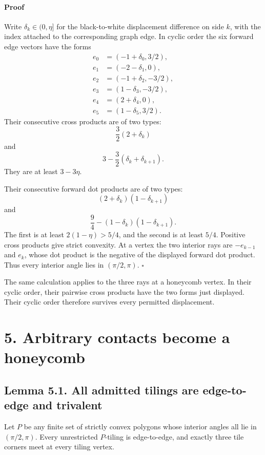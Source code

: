 \documentclass[11pt]{article}
\begin{document}
\paragraph{Proof}

Write \(\delta_k\in(0,\eta]\) for the black-to-white displacement difference
on side \(k\), with the index attached to the corresponding graph edge. In
cyclic order the six forward edge vectors have the forms
\[
\begin{split}
e_0&=(-1+\delta_0,3/2),\\
e_1&=(-2-\delta_1,0),\\
e_2&=(-1+\delta_2,-3/2),\\
e_3&=(1-\delta_3,-3/2),\\
e_4&=(2+\delta_4,0),\\
e_5&=(1-\delta_5,3/2).
\end{split}
\]
Their consecutive cross products are of two types:
\[
  \frac32(2+\delta_k)
\]
and
\[
  3-\frac32(\delta_k+\delta_{k+1}).
\]
They are at least \(3-3\eta\).

Their consecutive forward dot products are of two types:
\[
  (2+\delta_k)(1-\delta_{k+1})
\]
and
\[
  \frac94-(1-\delta_k)(1-\delta_{k+1}).
\]
The first is at least \(2(1-\eta)>5/4\), and the second is at least
\(5/4\). Positive cross products give strict convexity. At a vertex the two
interior rays are \(-e_{k-1}\) and \(e_k\), whose dot product is the negative
of the displayed forward dot product. Thus every interior angle lies in
\((\pi/2,\pi)\). \(\square\)

The same calculation applies to the three rays at a honeycomb vertex. In
their cyclic order, their pairwise cross products have the two forms just
displayed. Their cyclic order therefore survives every permitted
displacement.

\section*{5. Arbitrary contacts become a honeycomb}

\subsection*{Lemma 5.1. All admitted tilings are edge-to-edge and trivalent}

Let \(P\) be any finite set of strictly convex polygons whose interior angles
all lie in \((\pi/2,\pi)\). Every unrestricted \(P\)-tiling is edge-to-edge,
and exactly three tile corners meet at every tiling vertex.
\end{document}
